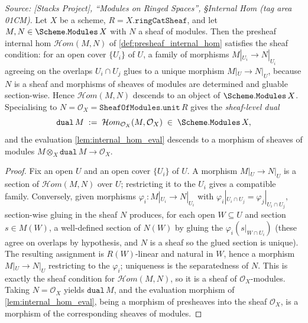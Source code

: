 \begin{lemma}\leanok
  \label{lem:internal_hom_isSheaf}
  \textit{Source: [Stacks Project], ``Modules on Ringed Spaces'', \S Internal Hom
  (tag area 01CM).}
  Let \(X\) be a scheme, \(R = X.\mathtt{ringCatSheaf}\), and let
  \(M, N \in \Scheme.\mathtt{Modules}\,X\) with \(N\) a sheaf of modules. Then the
  presheaf internal hom \(\mathcal{H}om(M, N)\) of \cref{def:presheaf_internal_hom}
  satisfies the sheaf condition: for an open cover \(\{U_i\}\) of \(U\), a family of
  morphisms \(M|_{U_i} \to N|_{U_i}\) agreeing on the overlaps
  \(U_i \cap U_j\) glues to a unique morphism \(M|_U \to N|_U\), because \(N\) is a
  sheaf and morphisms of sheaves of modules are determined and gluable section-wise.
  Hence \(\mathcal{H}om(M, N)\) descends to an object of \(\Scheme.\mathtt{Modules}\,X\).
  Specialising to \(N = \mathcal{O}_X = \mathtt{SheafOfModules.unit}\,R\) gives the
  \emph{sheaf-level dual}
  \[
    \mathtt{dual}\,M \;:=\; \mathcal{H}om_{\mathcal{O}_X}(M, \mathcal{O}_X)
    \;\in\; \Scheme.\mathtt{Modules}\,X,
  \]
  and the evaluation \cref{lem:internal_hom_eval} descends to a morphism of sheaves of
  modules \(M \otimes_X \mathtt{dual}\,M \to \mathcal{O}_X\).
\end{lemma}

\begin{proof}
  \leanok
  Fix an open \(U\) and an open cover \(\{U_i\}\) of \(U\). A morphism
  \(M|_U \to N|_U\) is a section of \(\mathcal{H}om(M, N)\) over \(U\); restricting it
  to the \(U_i\) gives a compatible family. Conversely, given morphisms
  \(\varphi_i : M|_{U_i} \to N|_{U_i}\) with \(\varphi_i|_{U_i \cap U_j} =
  \varphi_j|_{U_i \cap U_j}\), section-wise gluing in the sheaf \(N\) produces, for
  each open \(W \subseteq U\) and section \(s \in M(W)\), a well-defined section of
  \(N(W)\) by gluing the \(\varphi_i(s|_{W \cap U_i})\) (these agree on overlaps by
  hypothesis, and \(N\) is a sheaf so the glued section is unique). The resulting
  assignment is \(R(W)\)-linear and natural in \(W\), hence a morphism
  \(M|_U \to N|_U\) restricting to the \(\varphi_i\); uniqueness is the separatedness
  of \(N\). This is exactly the sheaf condition for \(\mathcal{H}om(M, N)\), so it is a
  sheaf of \(\mathcal{O}_X\)-modules. Taking \(N = \mathcal{O}_X\) yields
  \(\mathtt{dual}\,M\), and the evaluation morphism of \cref{lem:internal_hom_eval},
  being a morphism of presheaves into the sheaf \(\mathcal{O}_X\), is a morphism of
  the corresponding sheaves of modules.
\end{proof}

